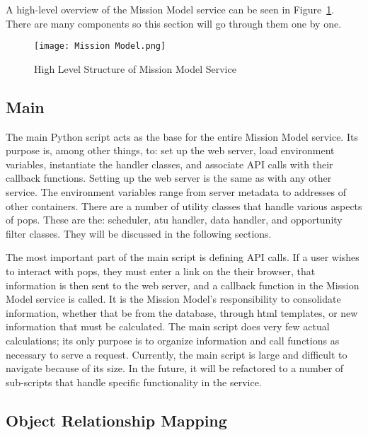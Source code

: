 A high-level overview of the Mission Model service can be seen in
Figure~\ref{fig:mission_model}. There are many components so this section will
go through them one by one.

\begin{figure}[h]
    \centering
    \texttt{[image: Mission Model.png]} 
    \caption{High Level Structure of Mission Model Service}
    \label{fig:mission_model} 
\end{figure}


\subsection{Main} 

The main Python script acts as the base for the entire Mission Model service.
Its purpose is, among other things, to: set up the web server, load environment
variables, instantiate the handler classes, and associate API calls with their
callback functions. Setting up the web server is the same as with any other
service. The environment variables range from server metadata to addresses of
other containers. There are a number of utility classes that handle various
aspects of \gls{pops}. These are the: scheduler, \gls{atu} handler, data
handler, and opportunity filter classes. They will be discussed in the
following sections. 

The most important part of the main script is defining API calls. If a user
wishes to interact with \gls{pops}, they must enter a link on the their
browser, that information is then sent to the web server, and a callback
function in the Mission Model service is called. It is the Mission Model's
responsibility to consolidate information, whether that be from the database,
through \gls{html} templates, or new information that must be calculated.  The
main script does very few actual calculations; its only purpose is to organize
information and call functions as necessary to serve a request.  Currently, the
main script is large and difficult to navigate because of its size.  In the
future, it will be refactored to a number of sub-scripts that handle specific
functionality in the service.

\subsection{Object Relationship Mapping}\label{sec:orm}

